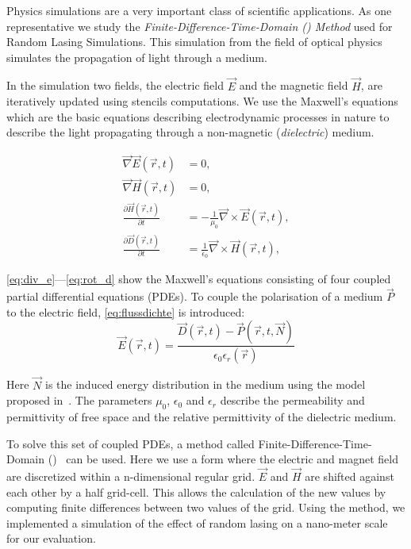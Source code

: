 Physics simulations are a very important class of scientific applications.
As one representative we study the \emph{Finite-Difference-Time-Domain (\FDTD) Method} used for Random Lasing Simulations.
This simulation from the field of optical physics simulates the propagation of light through a medium.

In the simulation two fields, the electric field $\vec{E}$ and the magnetic field $\vec{H}$, are iteratively updated using stencils computations.
We use the Maxwell's equations which are the basic equations describing electrodynamic processes in nature to describe the light propagating through a non-magnetic (\emph{dielectric}) medium.

\begin{align}
  \vec{\nabla}\vec{E}\left(\vec{r}, t\right) &= 0, \label{eq:div_e}\\
  \vec{\nabla}\vec{H}\left(\vec{r}, t\right) &= 0, \label{eq:div_h}\\
  \frac{\partial\vec{H}\left(\vec{r}, t\right)}{\partial t} &= -\frac{1}{\mu_0}\vec{\nabla} \times \vec{E}\left(\vec{r}, t\right), \label{eq:rot_h}\\
  \frac{\partial\vec{D}\left(\vec{r}, t\right)}{\partial t} &= \frac{1}{\epsilon_0}\vec{\nabla} \times \vec{H}\left(\vec{r}, t\right), \label{eq:rot_d}
\end{align}

\noindent
\autoref{eq:div_e}---\ref{eq:rot_d} show the Maxwell's equations consisting of four coupled partial differential equations (PDEs).
To couple the polarisation of a medium $\vec{P}$ to the electric field, \autoref{eq:flussdichte} is introduced:
\begin{equation}
\vec{E}\left(\vec{r}, t\right) = \frac{\vec{D}\left(\vec{r}, t\right) - \vec{P}\left(\vec{r}, t, \vec{N}\right)}{\epsilon_0\epsilon_r\left(\vec{r}\right)}
\label{eq:flussdichte}
\end{equation}

\noindent
Here $\vec{N}$ is the induced energy distribution in the medium using the model proposed in~\cite{Jiang2000}.
The parameters $\mu_0$, $\epsilon_0$ and $\epsilon_r$ describe the permeability and permittivity of free space and the relative permittivity of the dielectric medium.

To solve this set of coupled PDEs, a method called Finite-Difference-Time-Domain (\FDTD)~\cite{Yee1966} can be used.
Here we use a form where the electric and magnet field are discretized within a n-dimensional regular grid.
$\vec{E}$ and $\vec{H}$ are shifted against each other by a half grid-cell.
This allows the calculation of the new values by computing finite differences between two values of the grid.
Using the \FDTD method, we implemented a simulation of the effect of random lasing on a nano-meter scale~\cite{Cao1999} for our evaluation.

